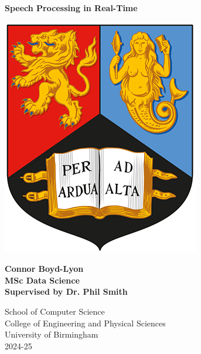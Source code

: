 
\thispagestyle{empty}

\begin{spacing}{2}
	\begin{center}
		\textbf{\Huge Speech Processing in Real-Time}
	\end{center}
	\vspace{5mm}
	\begin{center}
		\includegraphics[scale = 1.75]{Preamble/BirmCrest.png}
	\end{center}
	\vspace{5mm}
	\begin{center}
		\textbf{\LARGE Connor Boyd-Lyon}
		\vspace{15mm}
		\\\textbf{\Large MSc Data Science}
		\\\textbf{\Large Supervised by Dr. Phil Smith}
		\vspace{20mm}
	\end{center}
	\begin{center}
		{\Large School of Computer Science}
		\\ {\Large College of Engineering and Physical Sciences}
		\\ {\Large University of Birmingham}
		\\ {\Large 2024-25}
	\end{center}
\end{spacing}


